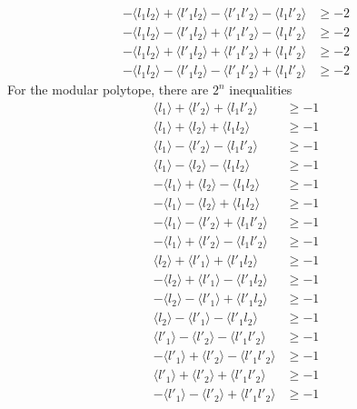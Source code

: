 \begin{equation}
\begin{aligned}
-\langle l_1 l_2 \rangle + \langle l'_1 l_2 \rangle - \langle l'_1 l'_2 \rangle - \langle l_1 l'_2 \rangle &\geq -2\\
-\langle l_1 l_2 \rangle - \langle l'_1 l_2 \rangle + \langle l'_1 l'_2 \rangle - \langle l_1 l'_2 \rangle &\geq -2\\
-\langle l_1 l_2 \rangle + \langle l'_1 l_2 \rangle + \langle l'_1 l'_2 \rangle + \langle l_1 l'_2 \rangle &\geq -2\\
-\langle l_1 l_2 \rangle - \langle l'_1 l_2 \rangle - \langle l'_1 l'_2 \rangle + \langle l_1 l'_2 \rangle &\geq -2
\end{aligned}
\end{equation}
For the modular polytope, there are $2^n$ inequalities
\begin{equation}
\begin{aligned}\label{eq:modineq}
\langle l_1 \rangle + \langle l'_2 \rangle + \langle l_1 l'_2 \rangle &\geq -1\\
\langle l_1 \rangle + \langle l_2 \rangle + \langle l_1 l_2 \rangle &\geq -1\\
\langle l_1 \rangle - \langle l'_2 \rangle - \langle l_1 l'_2 \rangle &\geq -1\\
\langle l_1 \rangle - \langle l_2 \rangle - \langle l_1 l_2 \rangle &\geq -1\\
-\langle l_1 \rangle + \langle l_2 \rangle - \langle l_1 l_2 \rangle &\geq -1\\
-\langle l_1 \rangle - \langle l_2 \rangle + \langle l_1 l_2 \rangle &\geq -1\\
-\langle l_1 \rangle - \langle l'_2 \rangle + \langle l_1 l'_2 \rangle &\geq -1\\
-\langle l_1 \rangle + \langle l'_2 \rangle - \langle l_1 l'_2 \rangle &\geq -1\\
\langle l_2 \rangle + \langle l'_1 \rangle + \langle l'_1 l_2 \rangle &\geq -1\\
-\langle l_2 \rangle + \langle l'_1 \rangle - \langle l'_1 l_2 \rangle &\geq -1\\
-\langle l_2 \rangle - \langle l'_1 \rangle + \langle l'_1 l_2 \rangle &\geq -1\\
\langle l_2 \rangle - \langle l'_1 \rangle - \langle l'_1 l_2 \rangle &\geq -1\\
\langle l'_1 \rangle - \langle l'_2 \rangle - \langle l'_1 l'_2 \rangle &\geq -1\\
-\langle l'_1 \rangle + \langle l'_2 \rangle - \langle l'_1 l'_2 \rangle &\geq -1\\
\langle l'_1 \rangle + \langle l'_2 \rangle + \langle l'_1 l'_2 \rangle &\geq -1\\
-\langle l'_1 \rangle - \langle l'_2 \rangle + \langle l'_1 l'_2 \rangle &\geq -1
\end{aligned}
\end{equation}
